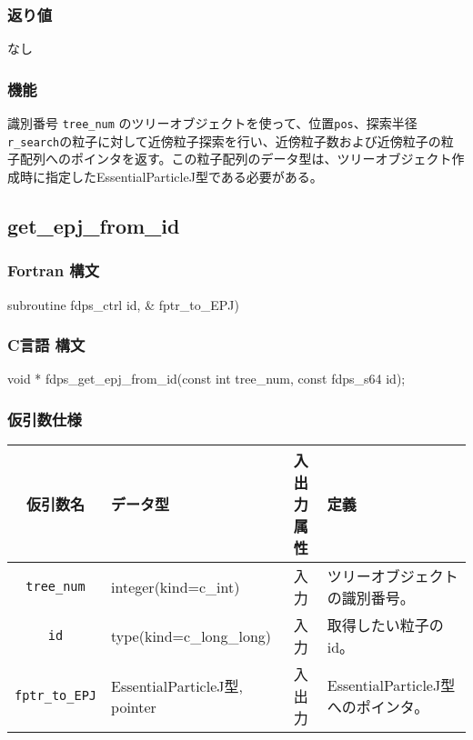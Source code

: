 \subsubsection*{返り値}
なし

\subsubsection*{機能}
識別番号 \texttt{tree\_num} のツリーオブジェクトを使って、位置\texttt{pos}、探索半径\texttt{r\_search}の粒子に対して近傍粒子探索を行い、近傍粒子数および近傍粒子の粒子配列へのポインタを返す。この粒子配列のデータ型は、ツリーオブジェクト作成時に指定したEssentialParticleJ型である必要がある。
\clearpage

\subsection{get\_epj\_from\_id}
\subsubsection*{Fortran 構文}
\begin{screen}
\begin{spverbatim}
subroutine fdps_ctrl%
                                     id,       &
                                     fptr_to_EPJ)
\end{spverbatim}
\end{screen}

\subsubsection*{C言語 構文}
\begin{screen}
\begin{spverbatim}
void * fdps_get_epj_from_id(const int tree_num,
                            const fdps_s64 id);
\end{spverbatim}
\end{screen}


\subsubsection*{仮引数仕様}
\begin{table}[h]
\begin{tabularx}{\linewidth}{cXcX}
\toprule
\rowcolor{Snow2}
仮引数名 & データ型 & 入出力属性 & 定義 \\
\midrule
\verb|tree_num|  & integer(kind=c\_int)   & 入力     & ツリーオブジェクトの識別番号。\\
\verb|id|  & type(kind=c\_long\_long)   & 入力     & 取得したい粒子の id。\\
\verb|fptr_to_EPJ|  & EssentialParticleJ型, \newline pointer   & 入出力     & EssentialParticleJ型へのポインタ。\\
\bottomrule
\end{tabularx}
\end{table}

